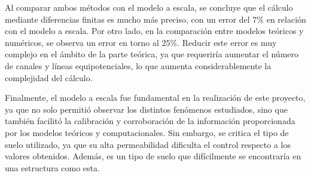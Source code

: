 \vspace{0.5cm}

Al comparar ambos métodos con el modelo a escala, se concluye que el cálculo mediante diferencias finitas es mucho más preciso, con un error del $7\%$ en relación con el modelo a escala. Por otro lado, en la comparación entre modelos teóricos y numéricos, se observa un error en torno al $25\%$. Reducir este error es muy complejo en el ámbito de la parte teórica, ya que requeriría aumentar el número de canales y líneas equipotenciales, lo que aumenta considerablemente la complejidad del cálculo.

\vspace{0.5cm}

Finalmente, el modelo a escala fue fundamental en la realización de este proyecto, ya que no solo permitió observar los distintos fenómenos estudiados, sino que también facilitó la calibración y corroboración de la información proporcionada por los modelos teóricos y computacionales. Sin embargo, se critica el tipo de suelo utilizado, ya que su alta permeabilidad dificulta el control respecto a los valores obtenidos. Además, es un tipo de suelo que difícilmente se encontraría en una estructura como esta.
